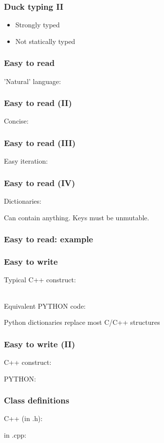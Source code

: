 \documentclass[14pt]{beamer}
\begin{document}
\begin{frame}
\frametitle{Duck typing II}
\begin{itemize}
\item Strongly typed

\item Not statically typed

\end{itemize}
\end{frame}

\begin{frame}
\frametitle{Easy to read}
'Natural' language:

\end{frame}

\begin{frame}
\frametitle{Easy to read (II)}
Concise:

\end{frame}

\begin{frame}
\frametitle{Easy to read (III)}
Easy iteration:

\end{frame}

\begin{frame}
\frametitle{Easy to read (IV)}
Dictionaries:

Can contain anything. Keys must be unmutable.
\end{frame}

\begin{frame}
\frametitle{Easy to read: example}

\end{frame}

\begin{frame}
\frametitle{Easy to write}
Typical C++ construct:

~\\
Equivalent PYTHON code:

Python dictionaries replace most C/C++ structures
\end{frame}

\begin{frame}
\frametitle{Easy to write (II)}
C++ construct:

PYTHON:

\end{frame}

\begin{frame}
\frametitle{Class definitions}
C++ (in .h):

in .cpp:

\end{frame}
\end{document}
